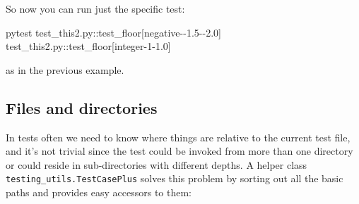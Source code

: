 \documentclass[
]{report}
\newenvironment{Shaded}{\begin{snugshade}}{\end{snugshade}}
\newcommand{\ExtensionTok}[1]{\textcolor[rgb]{0.00,0.23,0.31}{#1}}
\newcommand{\NormalTok}[1]{\textcolor[rgb]{0.00,0.23,0.31}{#1}}
\newcommand{\PreprocessorTok}[1]{\textcolor[rgb]{0.68,0.00,0.00}{#1}}
\newcommand{\SpecialStringTok}[1]{\textcolor[rgb]{0.13,0.47,0.30}{#1}}
\begin{document}
So now you can run just the specific test:

\begin{Shaded}
\begin{Highlighting}[]
\ExtensionTok{pytest}\NormalTok{ test\_this2.py::test\_floor}\PreprocessorTok{[}\SpecialStringTok{negative}\PreprocessorTok{{-}{-}}\SpecialStringTok{1.5}\PreprocessorTok{{-}{-}}\SpecialStringTok{2.0}\PreprocessorTok{]}\NormalTok{ test\_this2.py::test\_floor}\PreprocessorTok{[}\SpecialStringTok{integer}\PreprocessorTok{{-}}\SpecialStringTok{1}\PreprocessorTok{{-}}\SpecialStringTok{1.0}\PreprocessorTok{]}
\end{Highlighting}
\end{Shaded}

as in the previous example.

\subsection{Files and directories}\label{files-and-directories}

In tests often we need to know where things are relative to the current
test file, and it's not trivial since the test could be invoked from
more than one directory or could reside in sub-directories with
different depths. A helper class \texttt{testing\_utils.TestCasePlus}
solves this problem by sorting out all the basic paths and provides easy
accessors to them:
\end{document}
